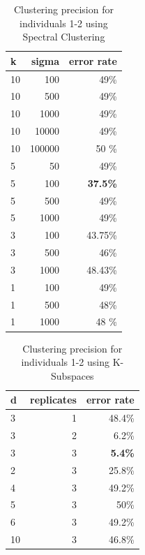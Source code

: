 \documentclass[12pt,a4paper,onecolumn]{article}
\begin{document}
\begin{table}[H]
	\centering
	\begin{tabular}{l|r|r}
		\toprule
		{}    k & sigma  & error rate      \\
		\midrule
		10      & 100    & 49\%            \\
		10      & 500    & 49\%            \\
		10      & 1000   & 49\%            \\
		10      & 10000  & 49\%            \\
		10      & 100000 & 50 \%           \\
		5       & 50     & 49\%            \\
		5       & 100    & \textbf{37.5\%} \\
		5       & 500    & 49\%            \\
		5       & 1000   & 49\%            \\
		3       & 100    & 43.75\%         \\
		3       & 500    & 46\%            \\
		3       & 1000   & 48.43\%         \\
		1       & 100    & 49\%            \\
		1       & 500    & 48\%            \\
		1       & 1000   & 48 \%           \\
		\bottomrule
	\end{tabular}
	\caption{Clustering precision for individuals 1-2 using Spectral Clustering}
\end{table}

\begin{table}[H]
	\centering
	\begin{tabular}{l|r|r}
		\toprule
		{}    d & replicates & error rate     \\
		\midrule
		3       & 1          & 48.4\%         \\
		3       & 2          & 6.2\%          \\
		3       & 3          & \textbf{5.4\%} \\
		2       & 3          & 25.8\%         \\
		4       & 3          & 49.2\%         \\
		5       & 3          & 50\%           \\
		6       & 3          & 49.2\%         \\
		10      & 3          & 46.8\%         \\
		\bottomrule
	\end{tabular}
	\caption{Clustering precision for individuals 1-2 using K-Subspaces}
\end{table}
\end{document}
